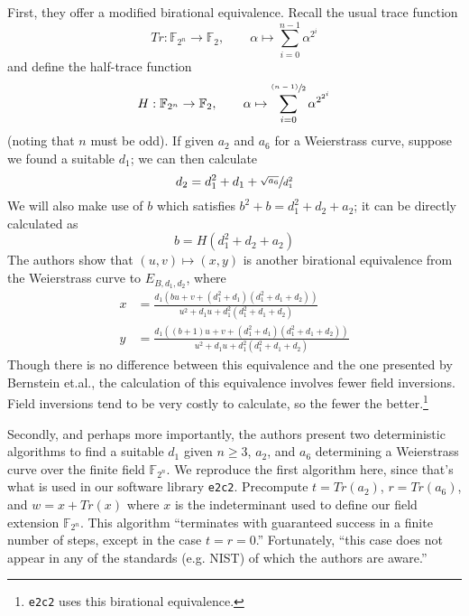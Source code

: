 First, they offer a modified birational equivalence.
Recall the usual trace function
\[
Tr: \mathbb{F}_{2^n} \to \mathbb{F}_2, \qquad
    \alpha \mapsto \sum_{i = 0}^{n - 1} \alpha^{2^i}
\]
    and define the half-trace function
\[
H: \mathbb{F}_{2^n} \to \mathbb{F}_2, \qquad
    \alpha \mapsto \sum_{i = 0}^{\sfrac{(n - 1)}{2}} \alpha^{2^{2^i}}
\]
    (noting that $n$ must be odd).
If given $a_2$ and $a_6$ for a Weierstrass curve, suppose we found a suitable
    $d_1$; we can then calculate
\[
d_2 = d_1^2 + d_1 + \sfrac{\sqrt{a_6}}{d_1^2}
\]
We will also make use of $b$ which satisfies $b^2 + b = d_1^2 + d_2 + a_2$; it
    can be directly calculated as
\[
b = H(d_1^2 + d_2 + a_2)
\]
The authors show that $(u, v) \mapsto (x, y)$ is another birational equivalence
    from the Weierstrass curve to $E_{B, d_1, d_2}$, where
\begin{align*}
x   &=  \frac{d_1(bu + v + (d_1^2 + d_1)(d_1^2 + d_1 + d_2))}
        {u^2 + d_1u + d_1^2(d_1^2 + d_1 + d_2)}\\
y   &=  \frac{d_1((b + 1)u + v + (d_1^2 + d_1)(d_1^2 + d_1 + d_2))}
        {u^2 + d_1u + d_1^2(d_1^2 + d_1 + d_2)}
\end{align*}
Though there is no difference between this equivalence and the one presented by
    Bernstein et.al., the calculation of this equivalence involves fewer field
    inversions.
Field inversions tend to be very costly to calculate, so the fewer the
    better.\footnote{\texttt{e2c2} uses this birational equivalence.}

Secondly, and perhaps more importantly, the authors present two deterministic
    algorithms to find a suitable $d_1$ given $n \ge 3$, $a_2$, and $a_6$
    determining a Weierstrass curve over the finite field $\mathbb{F}_{2^n}$.
We reproduce the first algorithm here, since that's what is used in our
    software library \texttt{e2c2}.
Precompute $t = Tr(a_2)$, $r = Tr(a_6)$, and $w = x + Tr(x)$ where $x$ is the
    indeterminant used to define our field extension $\mathbb{F}_{2^n}$.
This algorithm ``terminates with guaranteed success in a finite number of
    steps, except in the case $t = r = 0$.''
Fortunately, ``this case does not appear in any of the standards (e.g. NIST) of
    which the authors are aware.''

